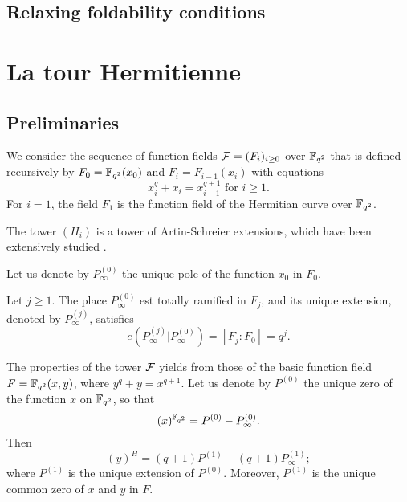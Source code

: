 \documentclass[10pt]{article}
\begin{document}
\subsection{Relaxing foldability conditions}



\section{La tour Hermitienne}

\subsection{Preliminaries}


We consider the sequence of function fields $\mathcal{F}=(F_i)_{i\geq 0}$ over $\mathbb{F}_{q^2}$ that is defined recursively by $F_0=\mathbb{F}_{q^2}(x_0)$ and $F_i = F_{i-1}(x_i)$ with equations
\[x_i^q+x_{i} = x_{i-1}^{q+1} \text{ for } i\geq 1.\]
For $i=1$, the field $F_1$ is the function field of the Hermitian curve over $\mathbb{F}_{q^2}$.

The tower $(H_i)$ is a tower of Artin-Schreier extensions, which have been extensively studied .


Let us denote by $P_{\infty}^{(0)}$ the unique pole of the function $x_0$ in $F_0$.

\begin{lemma}\cite[Proposition 3.7.8]{S08}
	Let $j \geq 1$. The place $P_{\infty}^{(0)}$ est totally ramified in $F_j$, and its unique extension, denoted by $P_{\infty}^{(j)}$, satisfies
\[e\left(P_{\infty}^{(j)}|P_{\infty}^{(0)}\right) = [F_j:F_0]=q^j.\]
\end{lemma}


The properties of the tower $\mathcal{F}$ yields from those of the basic function field $F=\mathbb{F}_{q^2}(x,y)$, where $y^q+y=x^{q+1}$. Let us denote by $P^{(0)}$ the unique zero of the function $x$ on $\mathbb{F}_{q^2}$, so that
\[(x)^{\mathbb{F}_{q^2}} = P^{(0)} - P^{(0)}_{\infty}.\]
Then
\[(y)^H = (q+1)P^{(1)} - (q+1)P^{(1)}_{\infty};\]
where $P^{(1)}$ is the unique extension of $P^{(0)}$. Moreover, $P^{(1)}$ is the unique common zero of $x$ and $y$ in $F$.
\end{document}
